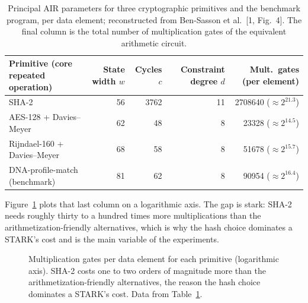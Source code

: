 \documentclass[11pt]{article}
\begin{document}
\begin{table}[htbp]\centering\footnotesize
\caption{Principal AIR parameters for three cryptographic primitives and the benchmark program, per
data element; reconstructed from Ben-Sasson et al.~[1, Fig.~4]. The final column is the total number of
multiplication gates of the equivalent arithmetic circuit.}
\label{tab:t3}
\begin{tabular}{l r r r r}
\toprule
Primitive (core repeated operation) & State width $w$ & Cycles $c$ & Constraint degree $d$ & Mult.\ gates (per element) \\
\midrule
SHA-2                       & 56 & 3762 & 11 & \num{2708640} ($\approx 2^{21.3}$) \\
AES-128 + Davies--Meyer     & 62 & 48   & 8  & \num{23328} ($\approx 2^{14.5}$) \\
Rijndael-160 + Davies--Meyer& 68 & 58   & 8  & \num{51678} ($\approx 2^{15.7}$) \\
DNA-profile-match (benchmark)& 81 & 62  & 8  & \num{90954} ($\approx 2^{16.4}$) \\
\bottomrule
\end{tabular}
\end{table}

Figure~\ref{fig:multgates} plots that last column on a logarithmic axis. The gap is stark: SHA-2 needs
roughly thirty to a hundred times more multiplications than the arithmetization-friendly alternatives,
which is why the hash choice dominates a STARK's cost and is the main variable of the experiments.

\begin{figure}[htbp]\centering
{}
\caption{Multiplication gates per data element for each primitive (logarithmic axis). SHA-2 costs one
to two orders of magnitude more than the arithmetization-friendly alternatives, the reason the hash
choice dominates a STARK's cost. Data from Table~\ref{tab:t3}.}
\label{fig:multgates}
\end{figure}
\end{document}
